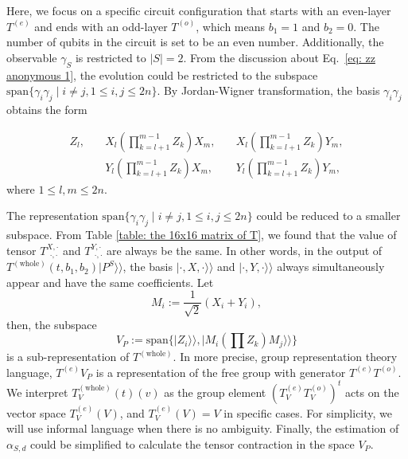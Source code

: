 \documentclass{article}
\newcommand{\Twhole}{T^{(\text{whole})}}
\newcommand{\supket}[1]{|#1 \rangle\rangle}
\begin{document}
Here, we focus on a specific circuit configuration that starts with an even-layer $T^{(e)}$ and ends with an odd-layer $T^{(o)}$, which means $b_1 = 1$ and $b_2 = 0$. The number of qubits in the circuit is set to be an even number. Additionally, the observable $\gamma_S$ is restricted to $|S|=2$. From the discussion about Eq.~\eqref{eq: zz anonymous 1}, the evolution could be restricted to the subspace $\mathrm{span}\{\gamma_i\gamma_j \mid i\neq j, 1\leq i,j \leq 2n \}$. By Jordan-Wigner transformation, the basis $\gamma_i\gamma_j$ obtains the form
        
\begin{equation}
\begin{aligned}
Z_l, \quad & X_l\left(\prod_{k=l+1}^{m-1} Z_k\right) X_m, \quad &X_l\left(\prod_{k=l+1}^{m-1} Z_k\right) Y_m, \\
& Y_l\left(\prod_{k=l+1}^{m-1} Z_k\right) X_m, \quad &Y_l\left(\prod_{k=l+1}^{m-1} Z_k\right) Y_m,
\end{aligned}
\end{equation}
where $1\leq l,m\leq 2n$.

The representation $\mathrm{span}\{\gamma_i\gamma_j \mid i\neq j, 1\leq i,j \leq 2n \}$ could be reduced to a smaller subspace. From Table \ref{table: the 16x16 matrix of T}, we found that the value of tensor $T^{X, \cdot}_{~~\cdot, \cdot}$ and $T^{Y, \cdot}_{~~\cdot, \cdot}$ are always be the same. In other words, in the output of $\Twhole (t, b_1,b_2)\supket{P^S}$, the basis $\supket{\cdot, X, \cdot}$ and $\supket{\cdot, Y, \cdot}$ always simultaneously appear and have the same coefficients. Let 
\begin{equation}
    M_i := \frac{1}{\sqrt{2}}(X_i + Y_i),
\end{equation}
then, the subspace 
\begin{equation}
    V_{P} := \mathrm{span}\{\supket{Z_i}, \supket{M_i(\prod Z_k)M_j}\}
\end{equation}
is a sub-representation of $\Twhole$. In more precise, group representation theory language, $T^{(e)}V_P$ is a representation of the free group with generator $T^{(e)}T^{(o)}$. We interpret $\Twhole_{V}(t)(v)$ as the group element $(T^{(e)}_{V}T^{(o)}_{V})^t$ acts on the vector space $T^{(e)}_{V} (V)$, and $T^{(e)}_{V} (V) = V$ in specific cases. For simplicity, we will use informal language when there is no ambiguity.
Finally, the estimation of $\alpha_{S,d}$ could be simplified to calculate the tensor contraction in the space $V_P$.
\end{document}
